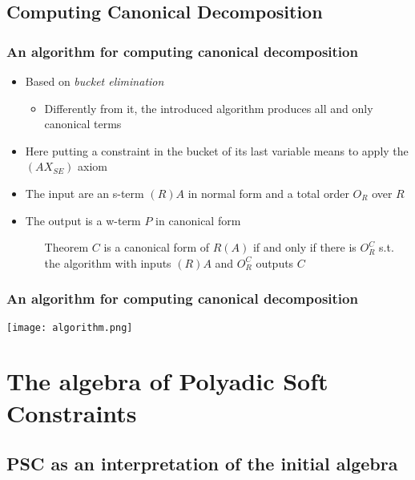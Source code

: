 \documentclass{beamer}
\begin{document}
\subsection{Computing Canonical Decomposition}

\begin{frame}
\frametitle{An algorithm for computing canonical decomposition}
\begin{itemize}
	\item Based on \emph{bucket elimination}
	\begin{itemize}
		\item Differently from it, the introduced algorithm produces all and only
		canonical terms
	\end{itemize}
\medskip
	\item Here putting a constraint in the bucket of its last variable means to apply
	the $(AX_{SE})$ axiom
\medskip
	\item The input are an s-term $(R)A$ in normal form and a total order $O_R$ over $R$
\medskip
	\item The output is a w-term $P$ in canonical form
\medskip
	\begin{itemize}
		\item[Theorem] $C$ is a canonical form of $R(A)$ if and only if there 
		is $O_R^C$ s.t. the algorithm with inputs $(R)A$ and $O_R^C$ outputs $C$
	\end{itemize}
\end{itemize}
\end{frame}

\begin{frame}
\frametitle{An algorithm for computing canonical decomposition}
\begin{center}
	\texttt{[image: algorithm.png]}
\end{center}
\end{frame}

\section{The algebra of Polyadic Soft Constraints}

\subsection{PSC as an interpretation of the initial algebra}
\end{document}
